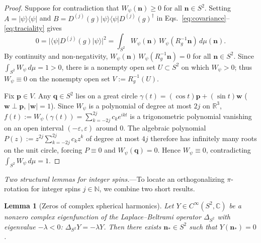 \documentclass[aps,prl,reprint,amsmath,amssymb,nofootinbib,floatfix]{revtex4-2}
\newtheorem{lemma}{Lemma}
\newcommand{\ket}[1]{\lvert #1 \rangle}
\newcommand{\bra}[1]{\langle #1 \rvert}
\newcommand{\LapS}{\Delta_{S^2}}
\newcommand{\bn}{\mathbf{n}}
\begin{document}
\begin{proof}
Suppose for contradiction that $W_\psi(\bn) \ge 0$ for all $\bn \in S^2$. Setting $A = \ket{\psi}\bra{\psi}$ and $B = D^{(j)}(g)\ket{\psi}\bra{\psi}D^{(j)}(g)^\dagger$ in Eqs.~\eqref{eq:covariance}--\eqref{eq:traciality} gives
\begin{equation}\label{eq:zero-overlap}
0 = \big|\bra{\psi} D^{(j)}(g) \ket{\psi}\big|^2 = \int_{S^2} W_\psi(\bn)\,W_\psi(R_g^{-1}\bn)\,d\mu(\bn).
\end{equation}
By continuity and non-negativity, $W_\psi(\bn)\,W_\psi(R_g^{-1}\bn) = 0$ for all $\bn \in S^2$. Since $\int_{S^2} W_\psi\,d\mu = 1 > 0$, there is a nonempty open set $U \subset S^2$ on which $W_\psi > 0$; thus $W_\psi \equiv 0$ on the nonempty open set $V := R_g^{-1}(U)$.

Fix $\mathbf{p} \in V$. Any $\mathbf{q} \in S^2$ lies on a great circle $\gamma(t) = (\cos t)\mathbf{p} + (\sin t)\mathbf{w}$ ($\mathbf{w} \perp \mathbf{p}$, $|\mathbf{w}|=1$). Since $W_\psi$ is a polynomial of degree at most $2j$ on $\mathbb{R}^3$, $f(t) := W_\psi(\gamma(t)) = \sum_{k=-2j}^{2j} c_k e^{ikt}$ is a trigonometric polynomial vanishing on an open interval $(-\varepsilon, \varepsilon)$ around $0$. The algebraic polynomial $P(z) := z^{2j}\sum_{k=-2j}^{2j} c_k z^k$ of degree at most $4j$ therefore has infinitely many roots on the unit circle, forcing $P \equiv 0$ and $W_\psi(\mathbf{q}) = 0$. Hence $W_\psi \equiv 0$, contradicting $\int_{S^2} W_\psi\,d\mu = 1$.
\end{proof}

\emph{Two structural lemmas for integer spins.}---To locate an orthogonalizing $\pi$-rotation for integer spins $j \in \mathbb{N}$, we combine two short results.

\begin{lemma}[Zeros of complex spherical harmonics]\label{lem:complex-sh-zero}
Let $Y \in C^\infty(S^2, \mathbb{C})$ be a nonzero complex eigenfunction of the Laplace--Beltrami operator $\LapS$ with eigenvalue $-\lambda < 0$: $\LapS Y = -\lambda Y$. Then there exists $\bn_* \in S^2$ such that $Y(\bn_*) = 0$.
\end{lemma}
\end{document}
